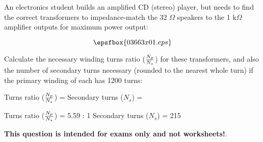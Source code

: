 

An electronics student builds an amplified CD (stereo) player, but needs to find the correct transformers to impedance-match the 32 $\Omega$ speakers to the 1 k$\Omega$ amplifier outputs for maximum power output:

$$\epsfbox{03663x01.eps}$$

Calculate the necessary winding turns ratio ($N_p \over N_s$) for these transformers, and also the number of secondary turns necessary (rounded to the nearest whole turn) if the primary winding of each has 1200 turns:

\vskip 10pt

Turns ratio ($N_p \over N_s$) = \hskip 150pt Secondary turns ($N_s$) = 







Turns ratio ($N_p \over N_s$) = 5.59 : 1 \hskip 100pt Secondary turns ($N_s$) = 215







{\bf This question is intended for exams only and not worksheets!}.



